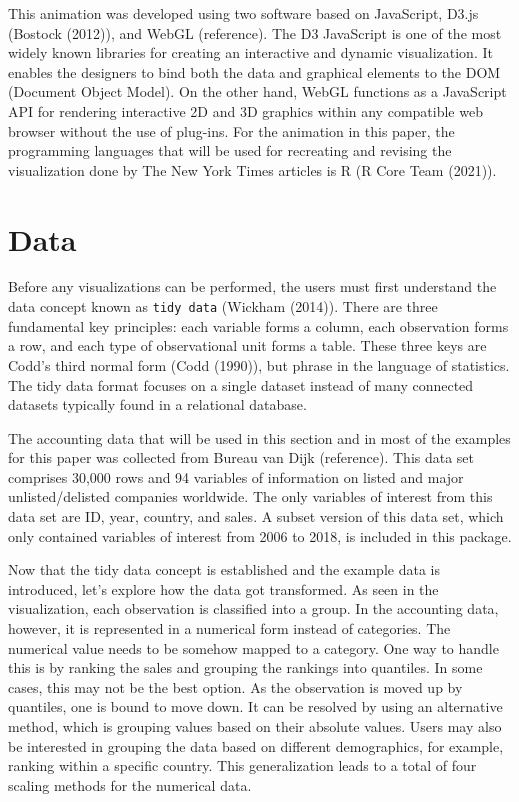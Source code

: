 This animation was developed using two software based on JavaScript, D3.js (Bostock (2012)), and WebGL (reference). The D3 JavaScript is one of the most widely known libraries for creating an interactive and dynamic visualization. It enables the designers to bind both the data and graphical elements to the DOM (Document Object Model). On the other hand, WebGL functions as a JavaScript API for rendering interactive 2D and 3D graphics within any compatible web browser without the use of plug-ins. For the animation in this paper, the programming languages that will be used for recreating and revising the visualization done by The New York Times articles is R (R Core Team (2021)).

\hypertarget{data}{%
\section{Data}\label{data}}

Before any visualizations can be performed, the users must first understand the data concept known as \texttt{tidy\ data} (Wickham (2014)). There are three fundamental key principles: each variable forms a column, each observation forms a row, and each type of observational unit forms a table. These three keys are Codd's third normal form (Codd (1990)), but phrase in the language of statistics. The tidy data format focuses on a single dataset instead of many connected datasets typically found in a relational database.

The accounting data that will be used in this section and in most of the examples for this paper was collected from Bureau van Dijk (reference). This data set comprises 30,000 rows and 94 variables of information on listed and major unlisted/delisted companies worldwide. The only variables of interest from this data set are ID, year, country, and sales. A subset version of this data set, which only contained variables of interest from 2006 to 2018, is included in this package.

Now that the tidy data concept is established and the example data is introduced, let's explore how the data got transformed. As seen in the visualization, each observation is classified into a group. In the accounting data, however, it is represented in a numerical form instead of categories. The numerical value needs to be somehow mapped to a category. One way to handle this is by ranking the sales and grouping the rankings into quantiles. In some cases, this may not be the best option. As the observation is moved up by quantiles, one is bound to move down. It can be resolved by using an alternative method, which is grouping values based on their absolute values. Users may also be interested in grouping the data based on different demographics, for example, ranking within a specific country. This generalization leads to a total of four scaling methods for the numerical data.


